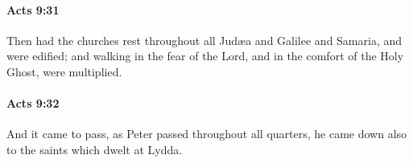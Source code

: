 		\paragraph{Acts 9:31} %
			\label{ACTS-9-31}

			Then had the churches rest throughout all Judæa and Galilee and Samaria, and were edified; and walking in the fear of the Lord, and in the comfort of the Holy Ghost, were multiplied.

			\begin{framed}
			\scriptsize
				\begin{compactdesc}
					\item[SBLG] 
				\end{compactdesc}
			\end{framed}

		\paragraph{Acts 9:32} %
			\label{ACTS-9-32}

			And it came to pass, as Peter passed throughout all quarters, he came down also to the saints which dwelt at Lydda.

